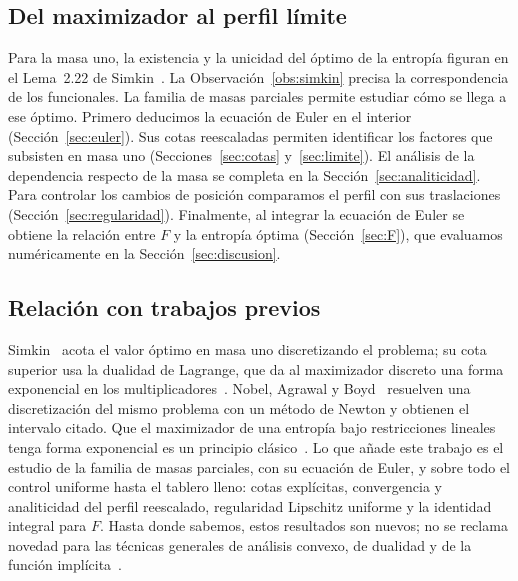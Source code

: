 \subsection{Del maximizador al perfil límite}

Para la masa uno, la existencia y la unicidad del óptimo de la entropía
figuran en el Lema~2.22 de Simkin~\cite{Simkin}. La
Observación~\ref{obs:simkin} precisa la correspondencia de los funcionales.
La familia de masas parciales permite estudiar cómo se llega a ese óptimo.
Primero deducimos la ecuación de Euler en el interior (Sección~\ref{sec:euler}).
Sus cotas reescaladas permiten identificar los factores que subsisten en masa uno
(Secciones~\ref{sec:cotas} y~\ref{sec:limite}). El análisis de la dependencia
respecto de la masa se completa en la Sección~\ref{sec:analiticidad}.
Para controlar los cambios de posición comparamos el perfil con sus traslaciones
(Sección~\ref{sec:regularidad}). Finalmente, al integrar la ecuación de Euler
se obtiene la relación entre $F$ y la entropía óptima (Sección~\ref{sec:F}),
que evaluamos numéricamente en la Sección~\ref{sec:discusion}.

\subsection{Relación con trabajos previos}

Simkin~\cite{Simkin} acota el valor óptimo en masa uno discretizando el problema; su cota
superior usa la dualidad de Lagrange, que da al maximizador discreto una forma exponencial en los
multiplicadores~\cite[Sección~6]{Simkin}. Nobel, Agrawal y Boyd~\cite{NAB} resuelven una
discretización del mismo problema con un método de Newton y obtienen el intervalo citado. Que el
maximizador de una entropía bajo restricciones lineales tenga forma exponencial es un principio
clásico~\cite{Csiszar}. Lo que añade este trabajo es el estudio de la familia de masas parciales,
con su ecuación de Euler, y sobre todo el control uniforme hasta el tablero lleno: cotas
explícitas, convergencia y analiticidad del perfil reescalado, regularidad Lipschitz uniforme y
la identidad integral para $F$. Hasta donde sabemos, estos resultados son nuevos; no se reclama novedad para las técnicas generales de
análisis convexo, de dualidad y de la función implícita~\cite{Brezis,Zeidler}.
